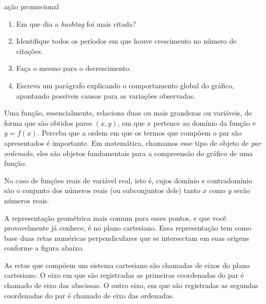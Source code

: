 \begin{task}{ ação promocional}
\begin{enumerate}
\item {} 
Em que dia a \emph{hashtag} foi mais citada?

\item {} 
Identifique todos os períodos em que houve crescimento no número de citações.

\item {} 
Faça o mesmo para o decrescimento.

\item {} 
Escreva um parágrafo explicando o comportamento global do gráfico, apontando possíveis causas para as variações observadas.

\end{enumerate}

\end{task}

Uma função, essencialmente, relaciona duas ou mais grandezas ou variáveis, de forma que são obtidos pares \((x,y)\), em que \(x\) pertence ao domínio da função e \(y=f(x)\). Perceba que a ordem em que os termos que compõem o par são apresentados é importante. Em matemática, chamamos esse tipo de objeto de \emph{par ordenado}, eles são objetos fundamentais para a compreensão do gráfico de uma função.

No caso de funções reais de variável real, isto é, cujos domínio e contradomínio são o conjunto dos números reais (ou subconjuntos dele) tanto \(x\) como \(y\) serão números reais.

A representação geométrica mais comum para esses pontos, e que você provavelmente já conhece, é no plano cartesiano. Essa representação tem como base duas retas numéricas perpendiculares que se intersectam em suas origens conforme a figura abaixo.

\begin{center}\end{center}

As retas que compõem um sistema cartesiano são chamadas de eixos do plano cartesiano. O eixo em que são registradas as primeiras coordenadas do par é chamado de eixo das abscissas. O outro eixo, em que são registradas as segundas coordenadas do par é chamado de eixo das ordenadas.


